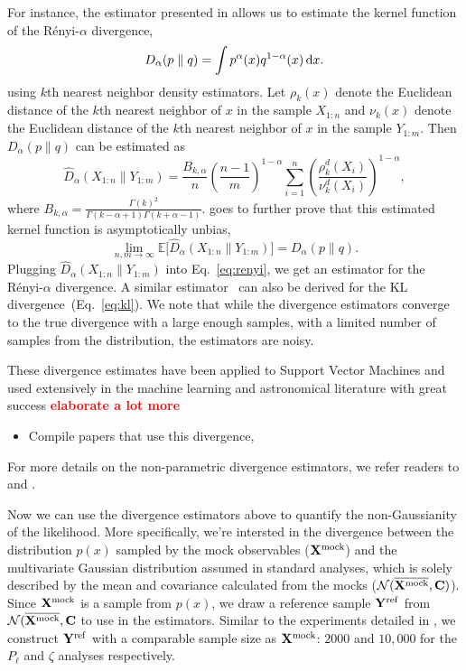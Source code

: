 \documentclass[12pt, letterpaper, preprint]{aastex}
\newcommand{\bitem}{\begin{itemize}}
\newcommand{\eitem}{\end{itemize}}
\newcommand{\beq}{\begin{equation}}
\newcommand{\eeq}{\end{equation}}
\newcommand{\todo}[1]{{\bf \textcolor{red}{#1}}}
\begin{document}
For instance, the estimator presented in \cite{poczos2012} allows us to estimate the kernel function 
of the R\'enyi-$\alpha$ divergence,
\beq \label{eq:d_alpha}
D_{\alpha} ( p \parallel q ) = \int p^\alpha(x) q^{1-\alpha}(x)\,{\rm d}x. 
\eeq
using $k$th nearest neighbor density estimators.
Let $\rho_k(x)$ denote the Euclidean distance of the $k$th nearest neighbor 
of $x$ in the sample $X_{1:n}$ and $\nu_k(x)$ denote the Euclidean distance 
of the $k$th nearest neighbor of $x$ in the sample $Y_{1:m}$. Then 
$D_{\alpha}(p \parallel q)$ can be estimated as 
\beq \label{eq:d_alpha_est}
\hat{D}_{\alpha}(X_{1:n} \parallel Y_{1:m}) = \frac{B_{k,\alpha}}{n} \left(\frac{n-1}{m}\right)^{1-\alpha}
\sum\limits_{i=1}^{n} \left(\frac{\rho_k^{d}(X_i)}{\nu_k^{d}(X_i)} \right)^{1-\alpha},
\eeq
where $B_{k, \alpha} = \frac{\Gamma(k)^2}{\Gamma(k-\alpha+1)\Gamma(k+\alpha-1)}$. 
\cite{poczos2012} goes to further prove that this estimated kernel function
is asymptotically unbias,
\beq
\lim_{n, m \rightarrow \infty} \mathbb{E} \big[ \hat{D}_{\alpha} (X_{1:n} \parallel Y_{1:m}) \big] = D_{\alpha} (p \parallel q).
\eeq
Plugging $\hat{D}_{\alpha}(X_{1:n} \parallel Y_{1:m})$ into Eq.~\ref{eq:renyi},
we get an estimator for the R\'enyi-$\alpha$ divergence. A similar estimator~\citep{wang2009} 
can also be derived for the KL divergence~(Eq.~\ref{eq:kl}). 
We note that while the divergence estimators converge to the true divergence with a large
enough samples, with a limited number of samples from the distribution, 
the estimators are noisy. 

These divergence estimates have been applied to Support Vector Machines and used 
extensively in the machine learning and astronomical literature with great success 
\todo{elaborate a lot more} 
\bitem 
    \item Compile papers that use this divergence, \cite{ntampaka2015, ntampaka2016}
\eitem
For more details on the non-parametric divergence estimators, we refer readers to 
\cite{poczos2012} and \cite{krishnamurthy2014}.

Now we can use the divergence estimators above to quantify the non-Gaussianity 
of the likelihood. More specifically, we're intersted in the divergence between
the distribution $p(x)$ sampled by the mock observables (${\bf X}^\mathrm{mock}$)
and the multivariate Gaussian distribution assumed in standard analyses,
which is solely described by the mean and covariance calculated from the mocks 
($\mathcal{N}(\overline{{\bf X}^\mathrm{mock}}, {\bf C})$). Since
${\bf X}^\mathrm{mock}$ is a sample from $p(x)$, we draw a reference sample 
${\bf Y}^\mathrm{ref}$ from $\mathcal{N}(\overline{{\bf X}^\mathrm{mock}}, {\bf C}$ 
to use in the estimators. Similar to the experiments detailed in \cite{poczos2012}, 
we construct ${\bf Y}^\mathrm{ref}$ with a comparable sample size as ${\bf X}^\mathrm{mock}$:  
$2000$ and $10,000$ for the $P_\ell$ and $\zeta$ analyses respectively. 
\end{document}
